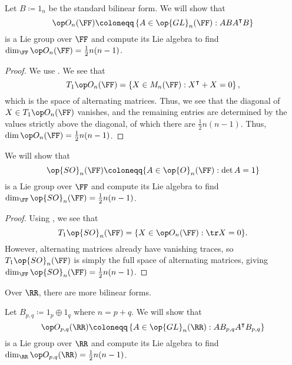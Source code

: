 \documentclass[../notes.tex]{subfiles}
\begin{document}
\begin{example}
	Let $B\coloneqq1_n$ be the standard bilinear form. We will show that
	\[\op O_n(\FF)\coloneqq\left\{A\in\op{GL}_n(\FF):ABA^\intercal B\right\}\]
	is a Lie group over $\FF$ and compute its Lie algebra to find $\dim_\FF\op O_n(\FF)=\frac12n(n-1)$.
\end{example}
\begin{proof}
	We use . We see that
	\[T_1\op O_n(\FF)=\left\{X\in M_n(\FF):X^\intercal+X=0\right\},\]
	which is the space of alternating matrices. Thus, we see that the diagonal of $X\in T_1\op O_n(\FF)$ vanishes, and the remaining entries are determined by the values strictly above the diagonal, of which there are $\frac12n(n-1)$. Thus, $\dim\op O_n(\FF)=\frac12n(n-1)$.
\end{proof}
\begin{example}
	We will show that
	\[\op{SO}_n(\FF)\coloneqq\{A\in\op{O}_n(\FF):\det A=1\}\]
	is a Lie group over $\FF$ and compute its Lie algebra to find $\dim_\FF\op{SO}_n(\FF)=\frac12n(n-1)$.
\end{example}
\begin{proof}
	Using , we see that
	\[T_1\op{SO}_n(\FF)=\{X\in\op O_n(\FF):\tr X=0\}.\]
	However, alternating matrices already have vanishing traces, so $T_1\op{SO}_n(\FF)$ is simply the full space of alternating matrices, giving $\dim_\FF\op{SO}_n(\FF)=\frac12n(n-1)$.
\end{proof}
Over $\RR$, there are more bilinear forms.
\begin{example}
	Let $B_{p,q}\coloneqq1_p\oplus1_q$ where $n=p+q$. We will show that
	\[\op O_{p,q}(\RR)\coloneqq\left\{A\in\op{GL}_n(\RR):AB_{p,q}A^\intercal B_{p,q}\right\}\]
	is a Lie group over $\RR$ and compute its Lie algebra to find $\dim_\RR\op O_{p,q}(\RR)=\frac12n(n-1)$.
\end{example}
\end{document}
